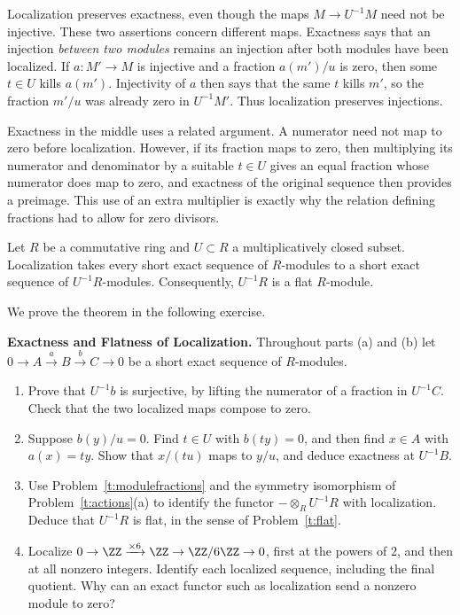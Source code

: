 \documentclass[12pt,reqno]{amsart}
\begin{document}
\hrulefill

Localization preserves exactness, even though the maps $M\to U^{-1}M$ need not be injective. These two assertions concern different maps. Exactness says that an injection \emph{between two modules} remains an injection after both modules have been localized. If $a:M'\to M$ is injective and a fraction $a(m')/u$ is zero, then some $t\in U$ kills $a(m')$. Injectivity of $a$ then says that the same $t$ kills $m'$, so the fraction $m'/u$ was already zero in $U^{-1}M'$. Thus localization preserves injections.

Exactness in the middle uses a related argument. A numerator need not map to zero before localization. However, if its fraction maps to zero, then multiplying its numerator and denominator by a suitable $t\in U$ gives an equal fraction whose numerator does map to zero, and exactness of the original sequence then provides a preimage. This use of an extra multiplier is exactly why the relation defining fractions had to allow for zero divisors.

\begin{theorem}
Let $R$ be a commutative ring and $U\subset R$ a multiplicatively closed subset. Localization takes every short exact sequence of $R$-modules to a short exact sequence of $U^{-1}R$-modules. Consequently, $U^{-1}R$ is a flat $R$-module.
\end{theorem}

We prove the theorem in the following exercise.

\hrulefill

\begin{problems}
\item\label{t:localexact} \textbf{Exactness and Flatness of Localization.} Throughout parts (a) and (b) let $0\to A\xrightarrow{a}B\xrightarrow{b}C\to0$ be a short exact sequence of $R$-modules.
\begin{enumerate}
\item Prove that $U^{-1}b$ is surjective, by lifting the numerator of a fraction in $U^{-1}C$. Check that the two localized maps compose to zero.
\item Suppose $b(y)/u=0$. Find $t\in U$ with $b(ty)=0$, and then find $x\in A$ with $a(x)=ty$. Show that $x/(tu)$ maps to $y/u$, and deduce exactness at $U^{-1}B$.
\item Use Problem~\ref{t:modulefractions} and the symmetry isomorphism of Problem~\ref{t:actions}(a) to identify the functor $-\otimes_RU^{-1}R$ with localization. Deduce that $U^{-1}R$ is flat, in the sense of Problem~\ref{t:flat}.
\item Localize $0\to\ZZ\xrightarrow{\times6}\ZZ\to\ZZ/6\ZZ\to0$, first at the powers of $2$, and then at all nonzero integers. Identify each localized sequence, including the final quotient. Why can an exact functor such as localization send a nonzero module to zero?
\end{enumerate}
\end{problems}
\end{document}
